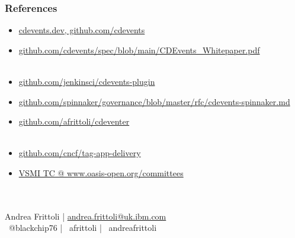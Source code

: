 \documentclass[aspectratio=169,11pt,hyperref={colorlinks=true}]{beamer}
\begin{document}
\begin{blackframe}
  \frametitle{References}
  \begin{itemize}
    \item \href{https://cdevents.dev}{cdevents.dev, github.com/cdevents}
    \item \href{https://github.com/cdevents/spec/blob/main/CDEvents_Whitepaper.pdf}{github.com/cdevents/spec/blob/main/CDEvents\_Whitepaper.pdf} \\~
    \item \href{https://github.com/jenkinsci/cdevents-plugin}{github.com/jenkinsci/cdevents-plugin}
    \item \href{https://github.com/spinnaker/governance/blob/master/rfc/cdevents-spinnaker.md}{github.com/spinnaker/governance/blob/master/rfc/cdevents-spinnaker.md}
    \item \href{https://github.com/afrittoli/cdeventer}{github.com/afrittoli/cdeventer} \\~
    \item \href{https://github.com/cncf/tag-app-delivery}{github.com/cncf/tag-app-delivery}
    \item \href{https://www.oasis-open.org/committees/tc_home.php?wg_abbrev=vsmi}{VSMI TC @ www.oasis-open.org/committees}
  \end{itemize}
  ~\\
  ~\\
  Andrea Frittoli | \href{mailto:andrea.frittoli@uk.ibm.com}{andrea.frittoli@uk.ibm.com} \\
  \faTwitter ~@blackchip76 | \faGithub ~afrittoli | \faLinkedin ~andreafrittoli
\end{blackframe}
\end{document}
